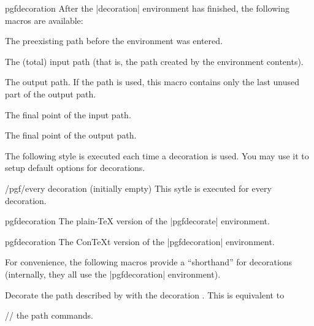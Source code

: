 \begin{environment}{{pgfdecoration}}
  After the |{decoration}| environment has finished, the following 
  macros are available:
	
  \begin{command}{\pgfdecorateexistingpath}
    The preexisting path before the environment was entered.
  \end{command}
	
  \begin{command}{\pgfdecoratedpath}
    The (total) input path (that is, the path created by the environment contents).
  \end{command}
	
  \begin{command}{\pgfdecorationpath}
    The output path. If the path is used, this macro contains only the
    last unused part of the output path.
  \end{command}
	
  \begin{command}{\pgfpointdecoratedpathlast}
    The final point of the input path.
  \end{command}
  
  \begin{command}{\pgfpointdecorationpathlast}
    The final point of the output path.
  \end{command}

  The following style is executed each time a decoration is used. You
  may use it to setup default options for decorations.
  \begin{stylekey}{/pgf/every decoration (initially \normalfont empty)}
    This sytle is executed for every decoration.
  \end{stylekey}
\end{environment}

\begin{plainenvironment}{{pgfdecoration}}
  The plain-\TeX{} version of the |{pgfdecorate}| environment.
\end{plainenvironment}

\begin{contextenvironment}{{pgfdecoration}}
  The Con\TeX t version of the |{pgfdecoration}| environment.
\end{contextenvironment}

For convenience, the following macros provide a ``shorthand''
for decorations (internally, they all use the |{pgfdecoration}|
environment).

\begin{command}{\pgfdecoratepath{}}
  Decorate the path described by  with the
  decoration . This is equivalent to
\begin{codeexample}
  // the path commands.
\endpgfdecorate    
\end{codeexample}
\end{command}

